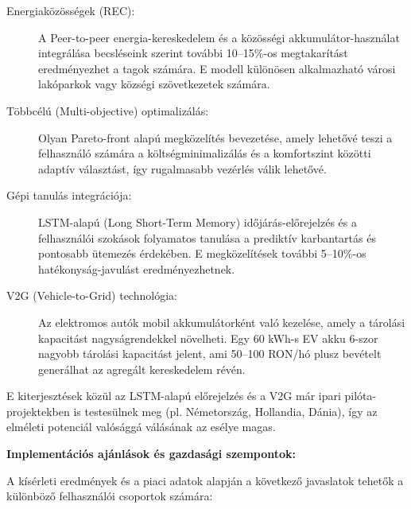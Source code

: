 \begin{description}
	\item[Energiaközösségek (REC):] A Peer-to-peer energia-kereskedelem és a közösségi akkumulátor-használat integrálása becsléseink szerint további 10--15\%-os megtakarítást eredményezhet a tagok számára. E modell különösen alkalmazható városi lakóparkok vagy községi szövetkezetek számára.
	
	\item[Többcélú (Multi-objective) optimalizálás:] Olyan Pareto-front alapú megközelítés bevezetése, amely lehetővé teszi a felhasználó számára a költségminimalizálás és a komfortszint közötti adaptív választást, így rugalmasabb vezérlés válik lehetővé.
	
	\item[Gépi tanulás integrációja:] LSTM-alapú (Long Short-Term Memory) időjárás-előrejelzés és a felhasználói szokások folyamatos tanulása a prediktív karbantartás és pontosabb ütemezés érdekében. E megközelítések további 5--10\%-os hatékonyság-javulást eredményezhetnek.
	
	\item[V2G (Vehicle-to-Grid) technológia:] Az elektromos autók mobil akkumulátorként való kezelése, amely a tárolási kapacitást nagyságrendekkel növelheti. Egy 60 kWh-s EV akku 6-szor nagyobb tárolási kapacitást jelent, ami 50--100 RON/hó plusz bevételt generálhat az agregált kereskedelem révén.
\end{description}

E kiterjesztések közül az LSTM-alapú előrejelzés és a V2G már ipari pilóta-projektekben is testesülnek meg (pl. Németország, Hollandia, Dánia), így az elméleti potenciál valósággá válásának az esélye magas.

\textbf{Implementációs ajánlások és gazdasági szempontok:}

A kísérleti eredmények és a piaci adatok alapján a következő javaslatok tehetők a különböző felhasználói csoportok számára:

